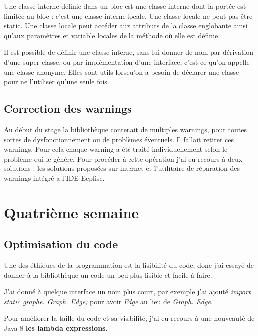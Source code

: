 \documentclass[12pt]{report}
\begin{document}
Une classe interne définie dans un bloc est une classe interne dont la portée est limitée au bloc : c’est une classe interne locale. Une classe locale ne peut pas être static. Une classe locale peut accéder aux attributs de la classe englobante ainsi qu'aux paramètres et variable locales de la méthode où elle est définie.\newline 

Il est possible de définir une classe interne, sans lui donner de nom par dérivation d'une super classe, ou par implémentation d’une interface, c'est ce qu'on appelle une classe anonyme. Elles sont utils lorsqu'on a besoin de déclarer une classe pour ne l'utiliser qu'une seule fois.\newline


\subsection{Correction des warnings}

Au début du stage la bibliothèque contenait de multiples warnings, pour toutes sortes de dysfonctionnement ou de problèmes éventuels. Il fallait retirer ces warnings. Pour cela chaque warning a été traité individuellement selon le problème qui le génère. Pour procéder à cette opération j'ai eu recours à deux solutions : les solutions proposées sur internet et l'utilitaire de réparation des warnings intégré a l'IDE Ecplise.
~\\

\section{Quatrième semaine}

\subsection{Optimisation du code}

Une des éthiques de la programmation est la lisibilité du code, donc j'ai essayé de donner à la bibliothèque un code un peu plus lisible et facile à faire. \newline

J'ai donné à quelque interface un nom plus court, par exemple j'ai ajouté \textit{import static graphe. Graph. Edge;} pour avoir \textit{Edge} au lieu de \textit{Graph. Edge}.\newline

Pour améliorer la taille du code et sa visibilité, j'ai eu recours à une nouveauté de Java 8 \textbf{les lambda expressions}.
\end{document}
